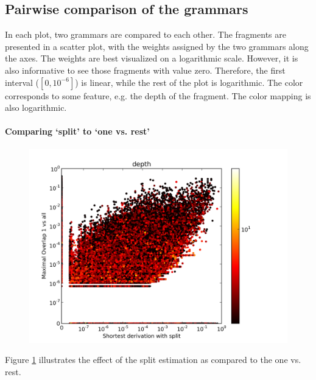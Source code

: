 \subsection{Pairwise comparison of the grammars}
In each plot, two grammars are compared to each other. The fragments are presented in a scatter plot, with the weights assigned by the two grammars along the axes. The weights are best visualized on a logarithmic scale. However, it is also informative to see those fragments with value zero. Therefore, the first interval ($[0,10^{-6}]$) is linear, while the rest of the plot is logarithmic. %
The color corresponds to some feature, e.g. the depth of the fragment. The color mapping is also logarithmic. 


\paragraph{Comparing `split' to `one vs. rest'}
\begin{figure}
\center
\includegraphics[width=\linewidth]{../data/plots/plot32.png}
\label{f:ddop-ddops-depth}
\end{figure}

Figure \ref{f:ddop-ddops-depth} illustrates the effect of the split estimation as compared to the one vs. rest. 


